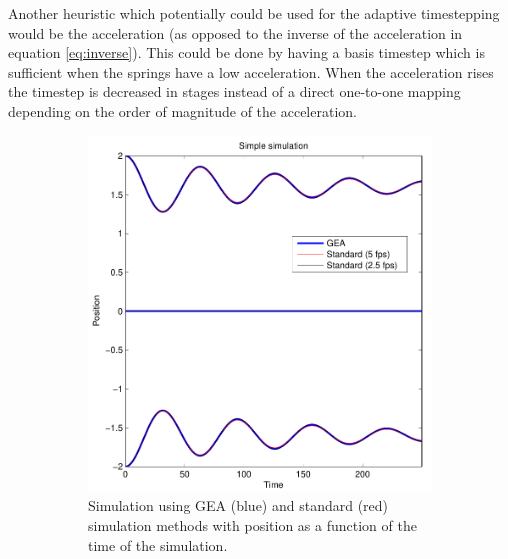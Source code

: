 \documentclass[11pt]{article}
\begin{document}
Another heuristic which potentially could be used for the adaptive
timestepping would be the acceleration (as opposed to the inverse of the
acceleration in equation \ref{eq:inverse}). This could be done by having a
basis timestep which is sufficient when the springs have a low acceleration.
When the acceleration rises the timestep is decreased in stages instead
of a direct one-to-one mapping depending on the order of magnitude of the
acceleration.

\begin{figure}
    \begin{subfigure}[t]{0.5\textwidth}
        \includegraphics[width=\textwidth]{../images/inverse_uniform_30fps.pdf}
        \caption{Simulation using GEA (blue) and standard (red) simulation methods with
        position as a function of the time of the simulation.}
        \label{fig:inverse_uniform_30fps_0}
    \end{subfigure}
    \begin{subfigure}[t]{0.5\textwidth}

\end{subfigure}
\end{figure}
\end{document}
